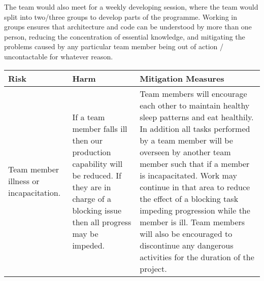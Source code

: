 The team would also meet for a weekly developing session, where the team would split into two/three groups to develop parts of the programme. Working in groups ensures that architecture and code can be understood by more than one person, reducing the concentration of essential knowledge, and mitigating the problems caused by any particular team member being out of action / uncontactable for whatever reason.

\newpage
\begin{center}
\begin{landscape}
    \begin{longtable}{|p{3cm}|p{7cm}|p{12cm}|}
        \hline
\textbf{Risk} & \textbf{Harm} & \textbf{Mitigation Measures}
\\ \hline
        Team member illness or incapacitation.           & If a team member falls ill then our production capability will be reduced. If they are in charge of a blocking issue then all progress may be impeded.                                                                                                                                                                                                                       & Team members will encourage each other to maintain healthy sleep patterns and eat healthily. In addition all tasks performed by a team member will be overseen by another team member such that if a member is incapacitated. Work may continue in that area to reduce the effect of a blocking task impeding progression while the member is ill. Team members will also be encouraged to discontinue any dangerous activities for the duration of the project.                                                                                                                                                                                                                                                                                                                                                                                                                                                                                                                                                                         \\ \hline

\end{longtable}
\end{landscape}
\end{center}

